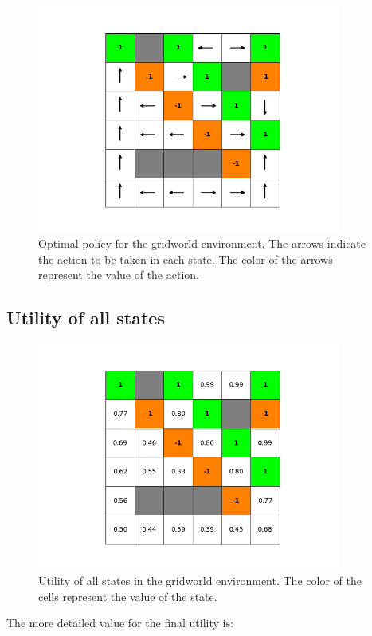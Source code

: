 \documentclass{article}
\begin{document}
\begin{figure}[H]
    \includegraphics[width=100mm]{../asset/value_iteration_policy.png}
    \caption{Optimal policy for the gridworld environment. The arrows indicate the action to be taken in each state. The color of the arrows represent the value of the action.}
    \label{fig:value_iteration_policy}
\end{figure}

\subsection{Utility of all states}

\begin{figure}[H]
    \includegraphics[width=100mm]{../asset/value_iteration_utility.png}
    \caption{Utility of all states in the gridworld environment. The color of the cells represent the value of the state.}
    \label{fig:value_iteration_utility}
\end{figure}

The more detailed value for the final utility is:
\end{document}
